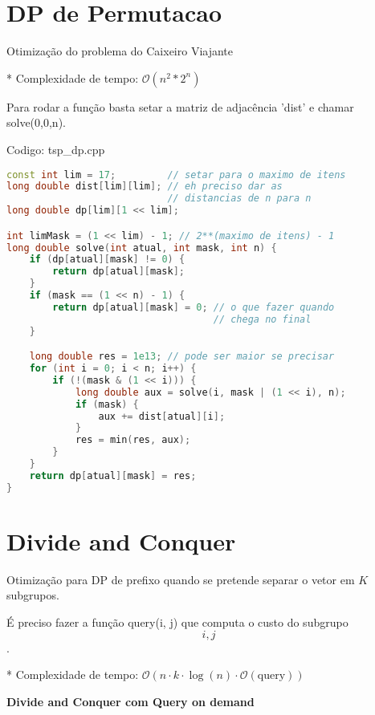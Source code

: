 \documentclass[10pt, a4paper, oneside]{book}
\begin{document}
\section{DP de Permutacao}


Otimização do problema do Caixeiro Viajante



* Complexidade de tempo: $\mathcal{O}(n^2 * 2^n)$



Para rodar a função basta setar a matriz de adjacência 'dist' e chamar solve(0,0,n).

\hfill

Codigo: tsp\_dp.cpp

\begin{lstlisting}[language=C++]
const int lim = 17;         // setar para o maximo de itens
long double dist[lim][lim]; // eh preciso dar as
                            // distancias de n para n
long double dp[lim][1 << lim];

int limMask = (1 << lim) - 1; // 2**(maximo de itens) - 1
long double solve(int atual, int mask, int n) {
    if (dp[atual][mask] != 0) {
        return dp[atual][mask];
    }
    if (mask == (1 << n) - 1) {
        return dp[atual][mask] = 0; // o que fazer quando
                                    // chega no final
    }

    long double res = 1e13; // pode ser maior se precisar
    for (int i = 0; i < n; i++) {
        if (!(mask & (1 << i))) {
            long double aux = solve(i, mask | (1 << i), n);
            if (mask) {
                aux += dist[atual][i];
            }
            res = min(res, aux);
        }
    }
    return dp[atual][mask] = res;
}
\end{lstlisting}
\hfill

\section{Divide and Conquer}


Otimização para DP de prefixo quando se pretende separar o vetor em \(K\) subgrupos.    



É preciso fazer a função query(i, j) que computa o custo do subgrupo \[i, j\].

* Complexidade de tempo: $\mathcal{O}(n \cdot k \cdot \log(n) \cdot  \mathcal{O}(\text{query}))$



\textbf{Divide and Conquer com Query on demand} 
\end{document}
